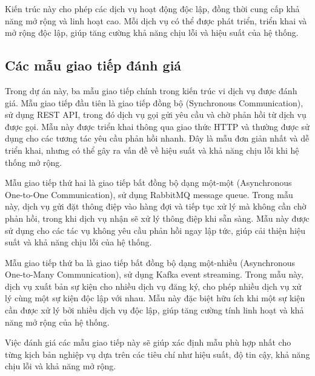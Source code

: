 Kiến trúc này cho phép các dịch vụ hoạt động độc lập, đồng thời cung cấp khả năng mở rộng và linh hoạt cao. Mỗi dịch vụ có thể được phát triển, triển khai và mở rộng độc lập, giúp tăng cường khả năng chịu lỗi và hiệu suất của hệ thống.

\subsection{Các mẫu giao tiếp đánh giá}
Trong dự án này, ba mẫu giao tiếp chính trong kiến trúc vi dịch vụ được đánh giá. Mẫu giao tiếp đầu tiên là giao tiếp đồng bộ (Synchronous Communication), sử dụng REST API, trong đó dịch vụ gọi gửi yêu cầu và chờ phản hồi từ dịch vụ được gọi. Mẫu này được triển khai thông qua giao thức HTTP và thường được sử dụng cho các tương tác yêu cầu phản hồi nhanh. Đây là mẫu đơn giản nhất và dễ triển khai, nhưng có thể gây ra vấn đề về hiệu suất và khả năng chịu lỗi khi hệ thống mở rộng.

Mẫu giao tiếp thứ hai là giao tiếp bất đồng bộ dạng một-một (Asynchronous One-to-One Communication), sử dụng RabbitMQ message queue. Trong mẫu này, dịch vụ gửi đặt thông điệp vào hàng đợi và tiếp tục xử lý mà không cần chờ phản hồi, trong khi dịch vụ nhận sẽ xử lý thông điệp khi sẵn sàng. Mẫu này được sử dụng cho các tác vụ không yêu cầu phản hồi ngay lập tức, giúp cải thiện hiệu suất và khả năng chịu lỗi của hệ thống.

Mẫu giao tiếp thứ ba là giao tiếp bất đồng bộ dạng một-nhiều (Asynchronous One-to-Many Communication), sử dụng Kafka event streaming. Trong mẫu này, dịch vụ xuất bản sự kiện cho nhiều dịch vụ đăng ký, cho phép nhiều dịch vụ xử lý cùng một sự kiện độc lập với nhau. Mẫu này đặc biệt hữu ích khi một sự kiện cần được xử lý bởi nhiều dịch vụ độc lập, giúp tăng cường tính linh hoạt và khả năng mở rộng của hệ thống.

Việc đánh giá các mẫu giao tiếp này sẽ giúp xác định mẫu phù hợp nhất cho từng kịch bản nghiệp vụ dựa trên các tiêu chí như hiệu suất, độ tin cậy, khả năng chịu lỗi và khả năng mở rộng.